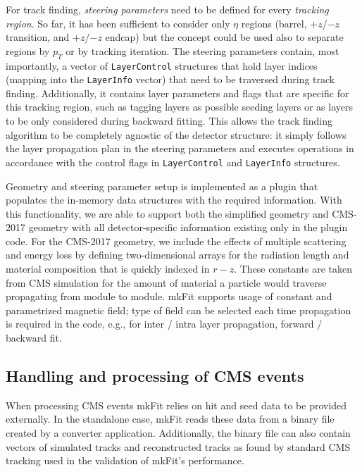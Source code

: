 \documentclass{webofc}
\def\mkfit{mkFit\xspace}
\def\stt#1{{\small\texttt{#1}}}
\begin{document}
For track finding, \emph{steering parameters} need to be defined for every
\emph{tracking region}. So far, it has been sufficient to consider only $\eta$
regions (barrel, $+z$/$-z$ transition, and $+z$/$-z$ endcap) but the concept
could be used also to separate regions by $p_T$ or by tracking iteration. The
steering parameters contain, most importantly, a vector of \stt{LayerControl}
structures that hold layer indices (mapping into the \stt{LayerInfo} vector)
that need to be traversed during track finding. Additionally, it contains
layer parameters and flags that are specific for this tracking region, such as
tagging layers as possible seeding layers or as layers to be only considered
during backward fitting. This allows the track finding algorithm to be completely
agnostic of the detector structure: it simply follows the layer propagation
plan in the steering parameters and executes operations in accordance with the
control flags in \stt{LayerControl} and \stt{LayerInfo} structures.

Geometry and steering parameter setup is implemented as a plugin that
populates the in-memory data structures with the required information. With
this functionality, we are able to support both the simplified geometry and
CMS-2017 geometry with all detector-specific information existing only in the
plugin code. For the CMS-2017 geometry, we include the effects of multiple
scattering and energy loss by defining two-dimensional arrays for the
radiation length and material composition that is quickly indexed in
$r-z$. These constants are taken from CMS simulation for the amount of
material a particle would traverse propagating from module to module. \mkfit
supports usage of constant and parametrized magnetic field; type of field can
be selected each time propagation is required in the code, e.g., for inter /
intra layer propagation, forward / backward fit.

\subsection{Handling and processing of CMS events}
\label{ssec:cms-event-processing}

When processing CMS events \mkfit relies on hit and seed data to be provided
externally. In the standalone case, \mkfit reads these data from a binary file
created by a converter application. Additionally, the binary file can also 
contain vectors of simulated tracks and reconstructed tracks as found by 
standard CMS tracking used in the validation of \mkfit's performance.
\end{document}
